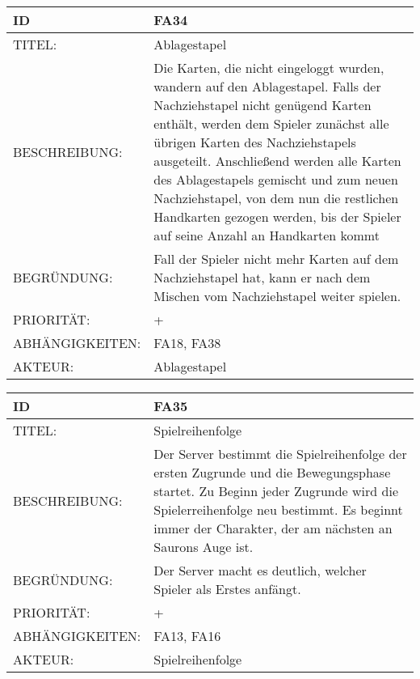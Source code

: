 \documentclass{uulm-assignment}
\begin{document}
    
    \begin{tabularx}{\textwidth}{|l|X |} \hline
        \textbf{ID} & \textbf{FA34} \\
        \hline
        TITEL: & Ablagestapel\\
        \hline
        BESCHREIBUNG: & Die Karten, die nicht eingeloggt wurden, wandern auf den Ablagestapel.  Falls der Nachziehstapel nicht genügend Karten enthält, werden dem
Spieler zunächst alle übrigen Karten des Nachziehstapels ausgeteilt. Anschließend werden alle Karten
des Ablagestapels gemischt und zum neuen Nachziehstapel, von dem nun die restlichen Handkarten
gezogen werden, bis der Spieler auf seine Anzahl an Handkarten kommt
        \\
        \hline
        BEGRÜNDUNG: & Fall der Spieler nicht mehr Karten auf dem Nachziehstapel hat, kann er nach dem Mischen vom Nachziehstapel weiter spielen.\\
        \hline
        PRIORITÄT: & +\\
        \hline
        ABHÄNGIGKEITEN: & FA18, FA38\\
        \hline
        AKTEUR: & Ablagestapel\\
        \hline
    \end{tabularx}
    
    \begin{tabularx}{\textwidth}{|l|X |} \hline
        \textbf{ID} & \textbf{FA35} \\
        \hline
        TITEL: & Spielreihenfolge\\
        \hline
        BESCHREIBUNG: & Der Server bestimmt die Spielreihenfolge der ersten Zugrunde und die Bewegungsphase startet. Zu Beginn jeder Zugrunde wird die Spielerreihenfolge neu bestimmt. Es beginnt immer der Charakter,
der am nächsten an Saurons Auge ist.
        \\
        \hline
        BEGRÜNDUNG: & Der Server macht es deutlich, welcher Spieler als Erstes anfängt.\\
        \hline
        PRIORITÄT: & +\\
        \hline
        ABHÄNGIGKEITEN: & FA13, FA16\\
        \hline
        AKTEUR: & Spielreihenfolge\\
        \hline
    \end{tabularx}
    
\end{document}
